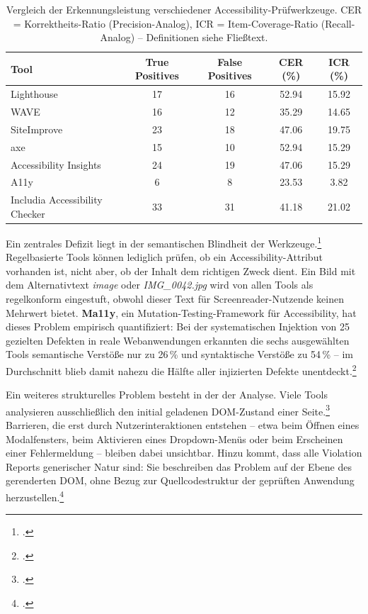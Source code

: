 \begin{table}[htbp]
\centering
\small
\begin{tabular}{lcccc}
\toprule
\textbf{Tool} & \textbf{True Positives} & \textbf{False Positives} & \textbf{CER (\%)} & \textbf{ICR (\%)} \\
\midrule
Lighthouse & 17 & 16 & 52.94 & 15.92 \\
WAVE & 16 & 12 & 35.29 & 14.65 \\
SiteImprove & 23 & 18 & 47.06 & 19.75 \\
axe & 15 & 10 & 52.94 & 15.29 \\
Accessibility Insights & 24 & 19 & 47.06 & 15.29 \\
A11y & 6 & 8 & 23.53 & 3.82 \\
Includia Accessibility Checker & 33 & 31 & 41.18 & 21.02 \\
\bottomrule
\end{tabular}
\caption[Erkennungsleistung von Accessibility-Tools]{Vergleich der Erkennungsleistung verschiedener Accessibility-Prüfwerkzeuge.\footnotemark{} CER = Korrektheits-Ratio (Precision-Analog), ICR = Item-Coverage-Ratio (Recall-Analog) -- Definitionen siehe Fließtext.}
\label{tab:tool_evaluation}
\end{table}

Ein zentrales Defizit liegt in der semantischen Blindheit der Werkzeuge.\footcite[Vgl.][]{fathallah_accessguru_2025} Regelbasierte Tools können lediglich prüfen, ob ein Accessibility-Attribut vorhanden ist, nicht aber, ob der Inhalt dem richtigen Zweck dient. Ein Bild mit dem Alternativtext \textit{image} oder \textit{IMG\_0042.jpg} wird von allen Tools als regelkonform eingestuft, obwohl dieser Text für Screenreader-Nutzende keinen Mehrwert bietet. \textbf{Ma11y}, ein Mutation-Testing-Framework für Accessibility, hat dieses Problem empirisch quantifiziert: Bei der systematischen Injektion von 25 gezielten Defekten in reale Web\-anwendungen erkannten die sechs ausgewählten Tools semantische Verstöße nur zu 26\,\% und syntaktische Verstöße zu 54\,\% -- im Durchschnitt blieb damit nahezu die Hälfte aller injizierten Defekte unentdeckt.\footcite[Vgl.][S. 108]{tafreshipour_ma11y_2024}

Ein weiteres strukturelles Problem besteht in der  der Analyse. Viele Tools analysieren ausschließlich den initial geladenen \ac{DOM}-Zustand einer Seite.\footcite[Vgl.][]{fathallah_accessguru_2025} Barrieren, die erst durch Nutzerinteraktionen entstehen -- etwa beim Öffnen eines Modalfensters, beim Aktivieren eines Dropdown-Menüs oder beim Erscheinen einer Fehlermeldung -- bleiben dabei unsichtbar. Hinzu kommt, dass alle Violation Reports generischer Natur sind: Sie beschreiben das Problem auf der Ebene des gerenderten \ac{DOM}, ohne Bezug zur Quellcodestruktur der geprüften Anwendung herzustellen.\footcite[Vgl.][]{delnevo_interaction_2024}

